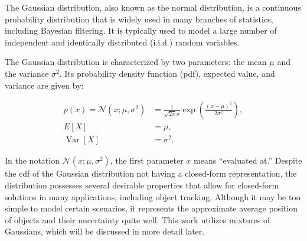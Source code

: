 The Gaussian distribution, also known as the normal distribution, is a 
continuous probability distribution that is widely used in many branches
of statistics, including Bayesian filtering. It is typically used to model
a large number of independent and identically distributed (i.i.d.) random variables.

The Gaussian distribution is characterized by two parameters: the mean 
$\mu$ and the variance $\sigma^2$. Its probability density function (pdf), 
expected value, and variance are given by:

\begin{align}
    p(x)
        =\mathscr{N}\left(x ; \mu, \sigma^2\right)
        &=\frac{1}{\sqrt{2 \pi} \sigma} \exp \left(\frac{(x-\mu)^2}{2 \sigma^2}\right), \\
    E[X] &= \mu, \\
    \operatorname{Var}[X] &= \sigma^2.
\end{align}

In the notation $\mathscr{N}\left(x ; \mu, \sigma^2\right)$, the first 
parameter $x$ means ``evaluated at.''
Despite the cdf of the Gaussian distribution not having a closed-form 
representation, the distribution possesses several desirable properties that 
allow for closed-form solutions in many applications, including object 
tracking. Although it may be too simple to model certain scenarios, it 
represents the approximate average position of objects and their uncertainty 
quite well. This work utilizes mixtures of Gaussians, which will be discussed 
in more detail later.
